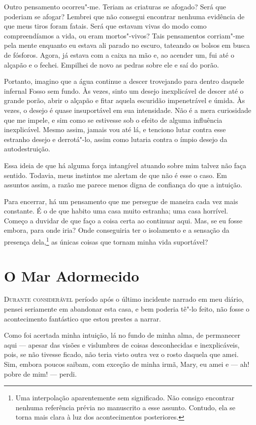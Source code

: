 Outro pensamento ocorreu"-me. Teriam as criaturas se afogado? Será que poderiam se afogar? Lembrei que não consegui
encontrar nenhuma evidência de que meus tiros foram fatais. Será que estavam vivas do modo como compreendíamos a vida,
ou eram mortos"-vivos? Tais pensamentos corriam"-me pela mente enquanto eu estava ali parado no escuro, tateando os
bolsos em busca de fósforos. Agora, já estava com a caixa na mão e, ao acender um, fui até o alçapão e o
fechei. Empilhei de novo as pedras sobre ele e saí do porão.

Portanto, imagino que a água continue a descer trovejando para dentro daquele infernal Fosso sem fundo. Às vezes, sinto
um desejo inexplicável de descer até o grande porão, abrir o alçapão e fitar aquela escuridão impenetrável e úmida. Às
vezes, o desejo é quase insuportável em sua intensidade. Não é a mera curiosidade que me impele, e sim como se
estivesse sob o efeito de alguma influência inexplicável. Mesmo assim, jamais vou até lá, e tenciono lutar contra esse
estranho desejo e derrotá"-lo, assim como lutaria contra o ímpio desejo da autodestruição.

Essa ideia de que há alguma força intangível atuando sobre mim talvez não faça sentido. Todavia, meus instintos me
alertam de que não é esse o caso. Em assuntos assim, a razão me parece menos digna de confiança do que a intuição.

Para encerrar, há um pensamento que me persegue de maneira cada vez mais
constante. É o de que habito uma casa muito estranha; uma casa horrível.
Começo a duvidar de que faço a coisa certa ao continuar aqui. Mas, se eu fosse
embora, para onde iria? Onde conseguiria ter o isolamento e a sensação da
presença dela,\footnote{ Uma interpolação aparentemente sem significado. Não
consigo encontrar nenhuma referência prévia no manuscrito a esse assunto.
Contudo, ela se torna mais clara à luz dos acontecimentos posteriores.}
as únicas coisas que tornam minha vida suportável?


\clearpage

\chapter{O Mar Adormecido}

\textsc{Durante considerável} período após o último incidente narrado em meu diário, pensei seriamente em abandonar esta
casa, e bem poderia tê"-lo feito, não fosse o acontecimento fantástico que estou prestes a narrar.

Como foi acertada minha intuição, lá no fundo de minha alma, de permanecer aqui --- apesar das visões e vislumbres de
coisas desconhecidas e inexplicáveis, pois, se não tivesse ficado, não teria visto outra vez o rosto daquela que amei.
Sim, embora poucos saibam, com exceção de minha irmã, Mary, eu amei e --- ah! pobre de mim! --- perdi.

